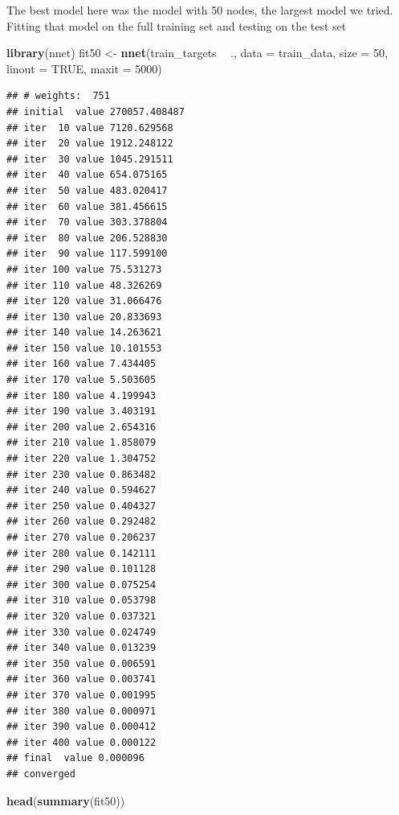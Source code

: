 \documentclass[10pt,ignorenonframetext,]{beamer}
\newenvironment{Shaded}{\begin{snugshade}}{\end{snugshade}}
\newcommand{\KeywordTok}[1]{\textcolor[rgb]{0.13,0.29,0.53}{\textbf{#1}}}
\newcommand{\DataTypeTok}[1]{\textcolor[rgb]{0.13,0.29,0.53}{#1}}
\newcommand{\DecValTok}[1]{\textcolor[rgb]{0.00,0.00,0.81}{#1}}
\newcommand{\StringTok}[1]{\textcolor[rgb]{0.31,0.60,0.02}{#1}}
\newcommand{\OtherTok}[1]{\textcolor[rgb]{0.56,0.35,0.01}{#1}}
\newcommand{\OperatorTok}[1]{\textcolor[rgb]{0.81,0.36,0.00}{\textbf{#1}}}
\newcommand{\NormalTok}[1]{#1}
\begin{document}
\begin{frame}[fragile]

The best model here was the model with 50 nodes, the largest model we
tried. Fitting that model on the full training set and testing on the
test set

\begin{Shaded}
\begin{Highlighting}[]
\KeywordTok{library}\NormalTok{(nnet)}
\NormalTok{fit50 <-}\StringTok{ }\KeywordTok{nnet}\NormalTok{(train_targets }\OperatorTok{~}\StringTok{ }\NormalTok{., }\DataTypeTok{data =}\NormalTok{ train_data, }\DataTypeTok{size =} \DecValTok{50}\NormalTok{, }\DataTypeTok{linout =} \OtherTok{TRUE}\NormalTok{, }
    \DataTypeTok{maxit =} \DecValTok{5000}\NormalTok{)}
\end{Highlighting}
\end{Shaded}

\begin{verbatim}
## # weights:  751
## initial  value 270057.408487 
## iter  10 value 7120.629568
## iter  20 value 1912.248122
## iter  30 value 1045.291511
## iter  40 value 654.075165
## iter  50 value 483.020417
## iter  60 value 381.456615
## iter  70 value 303.378804
## iter  80 value 206.528830
## iter  90 value 117.599100
## iter 100 value 75.531273
## iter 110 value 48.326269
## iter 120 value 31.066476
## iter 130 value 20.833693
## iter 140 value 14.263621
## iter 150 value 10.101553
## iter 160 value 7.434405
## iter 170 value 5.503605
## iter 180 value 4.199943
## iter 190 value 3.403191
## iter 200 value 2.654316
## iter 210 value 1.858079
## iter 220 value 1.304752
## iter 230 value 0.863482
## iter 240 value 0.594627
## iter 250 value 0.404327
## iter 260 value 0.292482
## iter 270 value 0.206237
## iter 280 value 0.142111
## iter 290 value 0.101128
## iter 300 value 0.075254
## iter 310 value 0.053798
## iter 320 value 0.037321
## iter 330 value 0.024749
## iter 340 value 0.013239
## iter 350 value 0.006591
## iter 360 value 0.003741
## iter 370 value 0.001995
## iter 380 value 0.000971
## iter 390 value 0.000412
## iter 400 value 0.000122
## final  value 0.000096 
## converged
\end{verbatim}

\begin{Shaded}
\begin{Highlighting}[]
\KeywordTok{head}\NormalTok{(}\KeywordTok{summary}\NormalTok{(fit50))}
\end{Highlighting}
\end{Shaded}


\end{frame}
\end{document}
